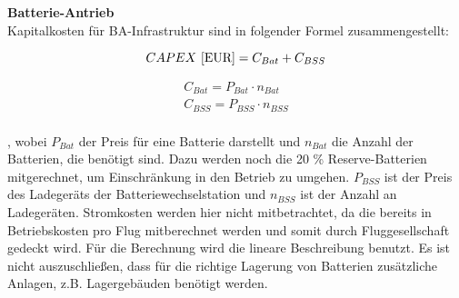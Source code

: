 \textbf{Batterie-Antrieb}\\
Kapitalkosten für BA-Infrastruktur sind in folgender Formel zusammengestellt:

\begin{equation}
     {CAPEX ~[\text{EUR}]} = C_{Bat} + C_{BSS} \\ %
     \label{BA_Infrastruktur}
  \end{equation}

\begin{equation}
   \begin{split}
  {C_{Bat}} = P_{Bat} \cdot n_{Bat}  \\
  {C_{BSS}} = P_{BSS} \cdot n_{BSS} \\
  \label{BA}
   \end{split}
  \end{equation}

, wobei $P_{Bat}$ der Preis für eine Batterie darstellt und $n_{Bat}$ die Anzahl der Batterien, die benötigt sind. 
Dazu werden noch die 20 \% Reserve-Batterien mitgerechnet, um Einschränkung in den Betrieb zu umgehen. 
$P_{BSS}$ ist der Preis des Ladegeräts der Batteriewechselstation und $n_{BSS}$ ist der Anzahl an Ladegeräten. %
Stromkosten werden hier nicht mitbetrachtet, da die bereits in Betriebskosten pro Flug mitberechnet werden und somit durch Fluggesellschaft
gedeckt wird. %
Für die Berechnung wird die lineare Beschreibung benutzt. Es ist nicht auszuschließen, dass für die richtige Lagerung von Batterien
zusätzliche Anlagen, z.B. Lagergebäuden benötigt werden. 
  




